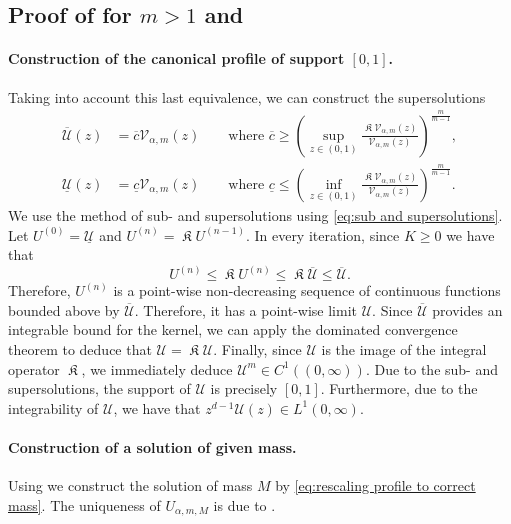 \documentclass[a4paper]{article}
\theoremstyle{definition}
\DeclareMathOperator{\fixedpoint}{\mathfrak K}
\begin{document}
%
%
%
%
%
%
%
%
%
%
%
%
%
%
%
%
%
%
%
%
%
%
%
%
%
%
%
%
%
%
%
%
%
\subsection{Proof of  for $m > 1$ and }
\label{sec:existence proof m>1}
\paragraph{Construction of the canonical profile of support $[0,1]$.}
Taking into account this last equivalence, we can construct the supersolutions
\begin{equation}
\label{eq:sub and supersolutions}
\begin{aligned}
  \overline{\mathcal U}(z)  & = \overline c \mathcal V_{\alpha,m}(z) \qquad \text{where } \overline c \ge \left(\sup_{z \in (0,1)} \frac{\fixedpoint \mathcal V_{\alpha,m} (z)}{\mathcal V_{\alpha,m}(z)}\right)^{\frac m {m-1}},
  \\
  \underline{\mathcal U}(z) & = \underline c \mathcal V_{\alpha,m}(z) \qquad \text{where } \underline c \le \left(\inf_{z \in (0,1)} \frac{\fixedpoint \mathcal V_{\alpha,m} (z)}{\mathcal V_{\alpha,m}(z)}\right)^{\frac m {m-1}}.
\end{aligned}
\end{equation}
We use the method of sub- and supersolutions using \eqref{eq:sub and supersolutions}. Let $U^{(0)} = \underline{\mathcal U}$ and $U^{(n)} = \fixedpoint U^{(n-1)}$. In every iteration, since $K \ge 0$ we have that
\begin{equation*}
U^{(n)} \le \fixedpoint U^{(n)} \le \fixedpoint \overline{\mathcal U} \le \overline{\mathcal U}.
\end{equation*}
Therefore, $U^{(n)}$ is a point-wise non-decreasing sequence of continuous functions bounded above by $\overline{\mathcal U}$. Therefore, it has a point-wise limit $\mathcal U$. Since $\overline{\mathcal U}$ provides an integrable bound for the kernel, we can apply the dominated convergence theorem to deduce that $\mathcal U = \fixedpoint \mathcal U$. Finally, since $\mathcal U$ is the image of the integral operator $\fixedpoint$, we immediately deduce $\mathcal U^m \in C^1((0,\infty))$. Due to the sub- and supersolutions, the support of $\mathcal U$ is precisely $[0,1]$. Furthermore, due to the integrability of $\mathcal U$, we have that $z^{d-1} \mathcal U(z) \in L^1 (0,\infty)$.

\paragraph{Construction of a solution of given mass.}
Using  we construct the solution of mass $M$ by \eqref{eq:rescaling profile to correct mass}. The uniqueness of $U_{\alpha,m,M}$ is due to .
\end{document}

